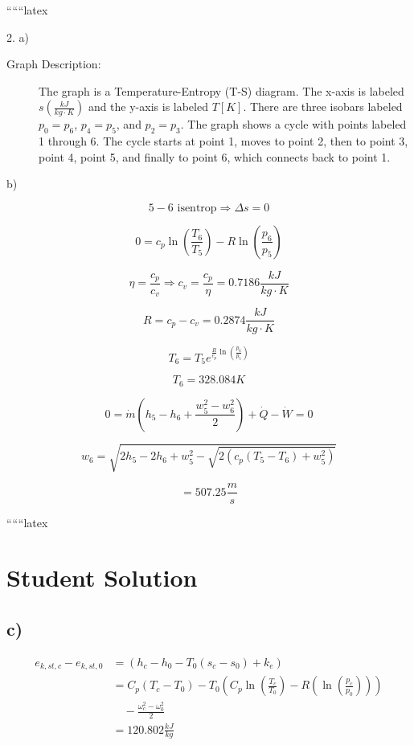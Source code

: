 
``````latex


2. a)

\begin{description}
    \item[Graph Description:] The graph is a Temperature-Entropy (T-S) diagram. The x-axis is labeled $s \left( \frac{kJ}{kg \cdot K} \right)$ and the y-axis is labeled $T \left[ K \right]$. There are three isobars labeled $p_0 = p_6$, $p_4 = p_5$, and $p_2 = p_3$. The graph shows a cycle with points labeled 1 through 6. The cycle starts at point 1, moves to point 2, then to point 3, point 4, point 5, and finally to point 6, which connects back to point 1.
\end{description}

b)

\[
5-6 \text{ isentrop} \Rightarrow \Delta s = 0
\]

\[
0 = c_p \ln \left( \frac{T_6}{T_5} \right) - R \ln \left( \frac{p_6}{p_5} \right)
\]

\[
\eta = \frac{c_p}{c_v} \Rightarrow c_v = \frac{c_p}{\eta} = 0.7186 \frac{kJ}{kg \cdot K}
\]

\[
R = c_p - c_v = 0.2874 \frac{kJ}{kg \cdot K}
\]

\[
T_6 = T_5 e^{\frac{R}{c_p} \ln \left( \frac{p_6}{p_5} \right)}
\]

\[
T_6 = 328.084 K
\]

\[
0 = \dot{m} \left( h_5 - h_6 + \frac{w_5^2 - w_6^2}{2} \right) + \dot{Q} - \dot{W} = 0
\]

\[
w_6 = \sqrt{2 h_5 - 2 h_6 + w_5^2 - \sqrt{2 \left( c_p \left( T_5 - T_6 \right) + w_5^2 \right)}}
\]

\[
= 507.25 \frac{m}{s}
\]

``````latex


\section*{Student Solution}

\subsection*{c)}

\begin{align*}
e_{k,st,c} - e_{k,st,0} &= (h_c - h_0 - T_0(s_c - s_0) + k_e) \\
&= C_p(T_c - T_0) - T_0 \left( C_p \ln \left( \frac{T_c}{T_0} \right) - R \left( \ln \left( \frac{p_c}{p_0} \right) \right) \right) \\
&\quad - \frac{\omega_c^2 - \omega_0^2}{2} \\
&= 120.802 \frac{kJ}{kg}
\end{align*}

